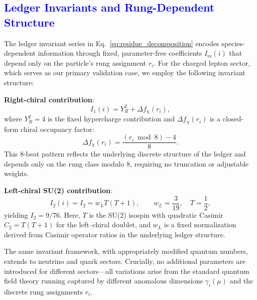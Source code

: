 \documentclass[%
amsmath,amssymb,
aps,
prb,
floatfix, showkeys, 10pt,
]{revtex4-2}
\newcommand{\modif}[1]{\textcolor{blue}{#1}}
\begin{document}
{\modif{ \subsection{Ledger Invariants and Rung-Dependent Structure}
\label{subsec:ledger-invariants}  }}
The ledger invariant series in Eq.~\eqref{eq:residue_decomposition} encodes species-dependent information through fixed, parameter-free coefficients $I_m(i)$ that depend only on the particle's rung assignment $r_i$. For the charged lepton sector, which serves as our primary validation case, we employ the following invariant structure:

\textbf{Right-chiral contribution}:
\begin{equation}
I_1(i) = Y_R^2 + \Delta f_\chi(r_i),
\label{eq:I1_invariant}
\end{equation}
where $Y_R^2 = 4$ is the fixed hypercharge contribution and $\Delta f_\chi(r_i)$ is a closed-form chiral occupancy factor:
\begin{equation}
\Delta f_\chi(r_i) = \frac{(r_i \bmod 8) - 4}{8}.
\label{eq:chiral_occupancy}
\end{equation}
This 8-beat pattern reflects the underlying discrete structure of the ledger and depends only on the rung class modulo 8, requiring no truncation or adjustable weights.

\textbf{Left-chiral SU(2) contribution}:
\begin{equation}
I_2(i) = I_2 = w_L T(T+1), \qquad w_L = \frac{3}{19}, \quad T = \frac{1}{2},
\label{eq:I2_invariant}
\end{equation}
yielding $I_2 = 9/76$. Here, $T$ is the SU(2) isospin with quadratic Casimir $C_2 = T(T+1)$ for the
left–chiral doublet, and $w_L$ is a fixed normalization derived from Casimir operator ratios in the underlying
ledger structure.

The same invariant framework, with appropriately modified quantum numbers, extends to neutrino and quark sectors. Crucially, no additional parameters are introduced for different sectors—all variations arise from the standard quantum field theory running captured by different anomalous dimensions $\gamma_i(\mu)$ and the discrete rung assignments $r_i$.
\end{document}
